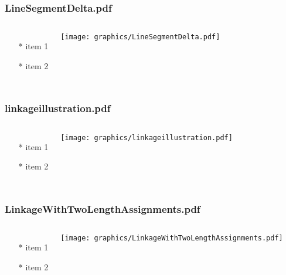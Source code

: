 \documentclass{beamer}
\begin{document}
\begin{frame} \frametitle{LineSegmentDelta.pdf}
    \begin{columns}[c]
        \begin{itemize}
            \item[*] item 1
            \item[*] item 2
        \end{itemize}
        \begin{minipage}{\linewidth}
            \begin{center}
            \texttt{[image: graphics/LineSegmentDelta.pdf]}
            \label{gfx:LineSegmentDelta.pdf}
            \end{center}
        \end{minipage}
    \end{columns}
\end{frame}
\begin{frame} \frametitle{linkageillustration.pdf}
    \begin{columns}[c]
        \begin{itemize}
            \item[*] item 1
            \item[*] item 2
        \end{itemize}
        \begin{minipage}{\linewidth}
            \begin{center}
            \texttt{[image: graphics/linkageillustration.pdf]}
            \label{gfx:linkageillustration.pdf}
            \end{center}
        \end{minipage}
    \end{columns}
\end{frame}
\begin{frame} \frametitle{LinkageWithTwoLengthAssignments.pdf}
    \begin{columns}[c]
        \begin{itemize}
            \item[*] item 1
            \item[*] item 2
        \end{itemize}
        \begin{minipage}{\linewidth}
            \begin{center}
            \texttt{[image: graphics/LinkageWithTwoLengthAssignments.pdf]}
            \label{gfx:LinkageWithTwoLengthAssignments.pdf}
            \end{center}
        \end{minipage}
    \end{columns}
\end{frame}
\end{document}
